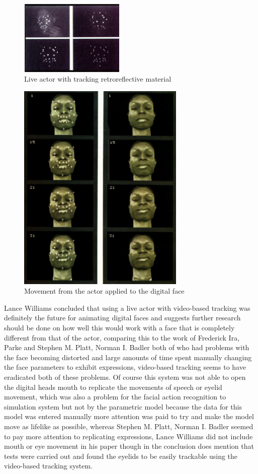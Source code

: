 \documentclass{scrartcl}
\begin{document}
\begin{figure}[h]
\includegraphics[width=5cm]{Live_actor_with_tracking_retroreflective_material.png}
\caption{Live actor with tracking retroreflective material \cite{williams1990performance}}
\label{fig:Model3}
\end{figure}

\begin{figure}[h]
\includegraphics[width=8cm]{Movement_from_Actor_applied_to_digital_Face.png}
\caption{Movement from the actor applied to the digital face \cite{williams1990performance}}
\label{fig:Model4}
\end{figure}

Lance Williams concluded that using a live actor with video-based tracking was definitely the future for animating digital faces and suggests further research should be done on how well this would work with a face that is completely different from that of the actor, comparing this to the work of Frederick Ira, Parke and Stephen M. Platt, Norman I. Badler both of who had problems with the face becoming distorted and large amounts of time spent manually changing the face parameters to exhibit expressions, video-based tracking seems to have eradicated both of these problems. Of course this system was not able to open the digital heads mouth to replicate the movements of speech or eyelid movement, which was also a problem for the facial action recognition to simulation system but not by the parametric model because the data for this model was entered manually more attention was paid to try and make the model move as lifelike as possible, whereas Stephen M. Platt, Norman I. Badler seemed to pay more attention to replicating expressions, Lance Williams did not include mouth or eye movement in his paper though in the conclusion does mention that tests were carried out and found the eyelids to be easily trackable using the video-based tracking system.
\end{document}
